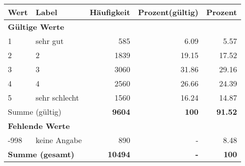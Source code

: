      \begin{longtable}{lXrrr}
     \toprule
     \textbf{Wert} & \textbf{Label} & \textbf{Häufigkeit} & \textbf{Prozent(gültig)} & \textbf{Prozent} \\
     \endhead
     \midrule
     \multicolumn{5}{l}{\textbf{Gültige Werte}}\\

     1 &
     \multicolumn{1}{X}{ sehr gut   } &


       \num{585} &
       \num[round-mode=places,round-precision=2]{6.09} &
         \num[round-mode=places,round-precision=2]{5.57} \\

     2 &
     \multicolumn{1}{X}{ 2   } &


       \num{1839} &
       \num[round-mode=places,round-precision=2]{19.15} &
         \num[round-mode=places,round-precision=2]{17.52} \\

     3 &
     \multicolumn{1}{X}{ 3   } &


       \num{3060} &
       \num[round-mode=places,round-precision=2]{31.86} &
         \num[round-mode=places,round-precision=2]{29.16} \\

     4 &
     \multicolumn{1}{X}{ 4   } &


       \num{2560} &
       \num[round-mode=places,round-precision=2]{26.66} &
         \num[round-mode=places,round-precision=2]{24.39} \\

     5 &
     \multicolumn{1}{X}{ sehr schlecht   } &


       \num{1560} &
       \num[round-mode=places,round-precision=2]{16.24} &
         \num[round-mode=places,round-precision=2]{14.87} \\
     \midrule
     \multicolumn{2}{l}{Summe (gültig)} &
       \textbf{\num{9604}} &
     \textbf{\num{100}} &
       \textbf{\num[round-mode=places,round-precision=2]{91.52}} \\
     \multicolumn{5}{l}{\textbf{Fehlende Werte}}\\
       -998 &
       keine Angabe &
         \num{890} &
        - &
         \num[round-mode=places,round-precision=2]{8.48} \\
     \midrule
     \multicolumn{2}{l}{\textbf{Summe (gesamt)}} &
          \textbf{\num{10494}} &
        \textbf{-} &
        \textbf{\num{100}} \\
     \bottomrule
     \end{longtable}
     
